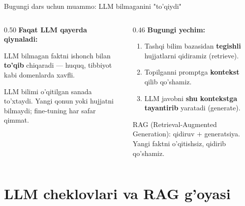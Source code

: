 \documentclass[aspectratio=169,11pt]{beamer}
\begin{document}
\begin{frame}{Bugungi dars uchun muammo: LLM bilmaganini "to'qiydi"}
  \begin{columns}[T]
    \begin{column}{0.50\textwidth}
      \textbf{Faqat LLM qayerda qiynaladi:}\\[3pt]
      \small
      \begin{tcolorbox}[warnbox,title={Gallyutsinatsiya},top=2pt,bottom=2pt]
        \footnotesize
        LLM bilmagan faktni ishonch bilan \textbf{to'qib} chiqaradi --- huquq,
        tibbiyot kabi domenlarda xavfli.
      \end{tcolorbox}
      \vspace{3pt}
      \begin{tcolorbox}[warnbox,title={Bilim eskiradi},top=2pt,bottom=2pt]
        \footnotesize
        LLM bilimi o'qitilgan sanada to'xtaydi. Yangi qonun yoki hujjatni
        bilmaydi; fine-tuning har safar qimmat.
      \end{tcolorbox}
    \end{column}
    \begin{column}{0.46\textwidth}
      \textbf{Bugungi yechim:}\\[4pt]
      \small
      \begin{enumerate}\setlength\itemsep{4pt}
        \item Tashqi bilim bazasidan \textbf{tegishli} hujjatlarni qidiramiz
              (retrieve).
        \item Topilganni promptga \textbf{kontekst} qilib qo'shamiz.
        \item LLM javobni \textbf{shu kontekstga tayantirib} yaratadi (generate).
      \end{enumerate}
      \vspace{5pt}
      \begin{tcolorbox}[okbox,top=2pt,bottom=2pt]
        \footnotesize
        RAG (Retrieval-Augmented Generation): qidiruv $+$ generatsiya.
        Yangi faktni o'qitishsiz, qidirib qo'shamiz.
      \end{tcolorbox}
    \end{column}
  \end{columns}
\end{frame}

\section[LLM va RAG]{LLM cheklovlari va RAG g'oyasi}
\end{document}
